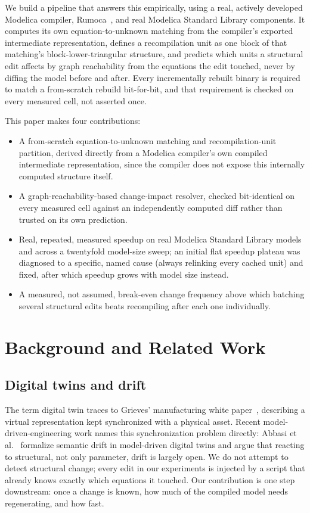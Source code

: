 \documentclass[journal]{IEEEtran}
\begin{document}
We build a pipeline that answers this empirically, using a real, actively developed Modelica compiler, Rumoca~\cite{condie2026rumoca}, and real Modelica Standard Library components. It computes its own equation-to-unknown matching from the compiler's exported intermediate representation, defines a recompilation unit as one block of that matching's block-lower-triangular structure, and predicts which units a structural edit affects by graph reachability from the equations the edit touched, never by diffing the model before and after. Every incrementally rebuilt binary is required to match a from-scratch rebuild bit-for-bit, and that requirement is checked on every measured cell, not asserted once.

This paper makes four contributions:
\begin{itemize}
\item A from-scratch equation-to-unknown matching and recompilation-unit partition, derived directly from a Modelica compiler's own compiled intermediate representation, since the compiler does not expose this internally computed structure itself.
\item A graph-reachability-based change-impact resolver, checked bit-identical on every measured cell against an independently computed diff rather than trusted on its own prediction.
\item Real, repeated, measured speedup on real Modelica Standard Library models and across a twentyfold model-size sweep; an initial flat speedup plateau was diagnosed to a specific, named cause (always relinking every cached unit) and fixed, after which speedup grows with model size instead.
\item A measured, not assumed, break-even change frequency above which batching several structural edits beats recompiling after each one individually.
\end{itemize}

\section{Background and Related Work}

\subsection{Digital twins and drift}

The term digital twin traces to Grieves' manufacturing white paper~\cite{grieves2014twin}, describing a virtual representation kept synchronized with a physical asset. Recent model-driven-engineering work names this synchronization problem directly: Abbasi et al.~\cite{abbasi2024drift} formalize semantic drift in model-driven digital twins and argue that reacting to structural, not only parameter, drift is largely open. We do not attempt to detect structural change; every edit in our experiments is injected by a script that already knows exactly which equations it touched. Our contribution is one step downstream: once a change is known, how much of the compiled model needs regenerating, and how fast.
\end{document}
